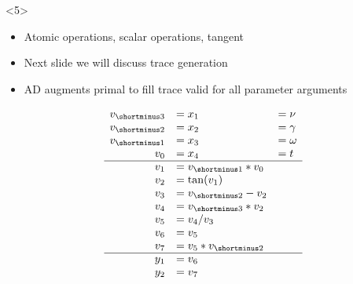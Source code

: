 \documentclass[11pt]{beamer}
\begin{document}
\begin{frame}[fragile]
	\begin{onlyenv}
		\begin{minipage}{.45\linewidth}
			\begin{itemize}
				\item Atomic operations, scalar operations, tangent
				\item Next slide we will discuss trace generation
				\item AD augments primal to fill trace valid for all parameter arguments
			\end{itemize}
		\end{minipage}
		\hfill
		\begin{minipage}{.45\linewidth}
			\scriptsize
			\[
			\begin{array}{ rll }
				v_{\shortminus 3} &= x_1 &= \nu \\
				v_{\shortminus 2} &= x_2 &= \gamma \\
				v_{\shortminus 1} &= x_3 &= \omega \\
				v_0 &= x_4 &= t \\
				\cline{1-3}
				v_1 &= v_{\shortminus 1}*v_0 \\
				v_2 &= \tan(v_1) &  \\
				v_3 &= v_{\shortminus 2} - v_2 \\
				v_4 &= v_{\shortminus 3} * v_2 \\
				v_5 &= v_4 / v_3 \\
				v_6 &= v_5 \\
				v_7 &= v_5 * v_{\shortminus 2} \\
				\cline{1-3}
				y_1 &= v_6 \\
				y_2 &= v_7
			\end{array}
			\]
		\end{minipage}
	\end{onlyenv}
\end{frame}
\end{document}
